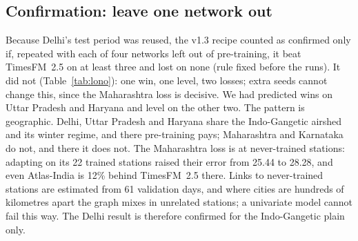 \documentclass{article}
\newcommand{\pmu}{\ensuremath{\mu\mathrm{g/m^3}}}
\newcommand{\trk}[1]{\textsc{#1}}
\begin{document}
\subsection{Confirmation: leave one network out}
\label{sec:lono}

\begin{table}[t]
\caption{\textbf{Leave one network out} (four largest networks after Delhi, fixed in advance). Atlas pre-trained on
the other 13 networks (seed 500), adapted on the network's history as in v1.3, scored on its all-India test windows.
MAE \trk{s} / \trk{u} in \pmu; last column: adapted against TimesFM~2.5.}
\label{tab:lono}
\centering\small
{}
\end{table}

Because Delhi's test period was reused, the v1.3 recipe counted as confirmed only if, repeated with each of four
networks left out of pre-training, it beat TimesFM~2.5 on at least three and lost on none (rule fixed before the
runs). It did not (Table~\ref{tab:lono}): one win, one level, two losses; extra seeds cannot change this, since the
Maharashtra loss is decisive. We had predicted wins on Uttar Pradesh and Haryana and level on the other two. The
pattern is geographic. Delhi, Uttar Pradesh and Haryana share the Indo-Gangetic airshed and its winter regime, and
there pre-training pays; Maharashtra and Karnataka do not, and there it does not. The Maharashtra loss is at
never-trained stations: adapting on its 22 trained stations raised their error from 25.44 to 28.28, and even
Atlas-India is 12\% behind TimesFM~2.5 there. Links to never-trained stations are estimated from 61 validation days,
and where cities are hundreds of kilometres apart the graph mixes in unrelated stations; a univariate model cannot
fail this way. The Delhi result is therefore confirmed for the Indo-Gangetic plain only.
\end{document}
